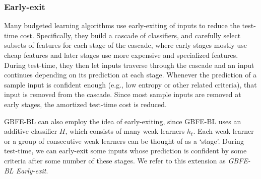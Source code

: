 \subsubsection{Early-exit}
\label{sec:early-exit}
Many budgeted learning algorithms \citep{cambazoglu2010early,chen2011,Saberian2010,Lefakis2010} use early-exiting of inputs to reduce the test-time cost. Specifically, they build a cascade of classifiers, and carefully select subsets of features for each stage of the cascade, where early stages mostly use cheap features and later stages use more expensive and specialized features. During test-time, they then let inputs traverse through the cascade and an input continues depending on its prediction at each stage. %
Whenever the prediction of a sample input is confident enough (e.g., low entropy or other related criteria), that input is removed from the cascade. Since most sample inputs are removed at early stages, the amortized test-time cost is reduced. 

GBFE-BL can also employ the idea of early-exiting, since GBFE-BL uses an additive classifier $H$, which consists of many weak learners $h_t$. Each weak learner or a group of consecutive weak learners can be thought of as a `stage'. During test-time, we can early-exit some inputs whose prediction is confident by some criteria after some number of these stages. We refer to this extension as \emph{GBFE-BL Early-exit}. 



